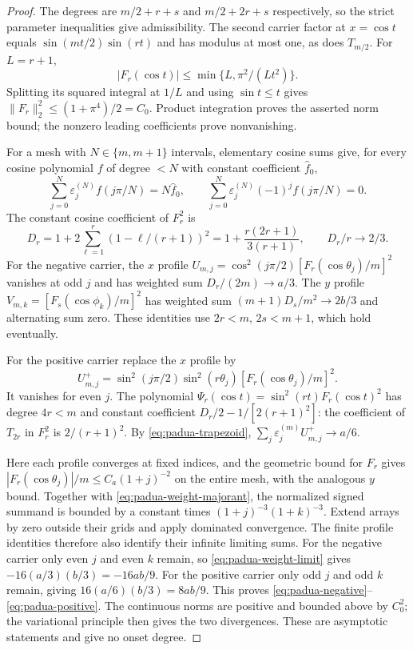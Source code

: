 \documentclass[preprint,12pt,a4paper]{elsarticle}
\theoremstyle{remark}
\begin{document}
\begin{proof}
The degrees are $m/2+r+s$ and $m/2+2r+s$ respectively, so the
strict parameter inequalities give admissibility. The second carrier
factor at $x=\cos t$ equals $\sin(mt/2)\sin(rt)$ and has modulus
at most one, as does $T_{m/2}$. For $L=r+1$,
\[
 |F_r(\cos t)|\le\min\{L,\pi^2/(Lt^2)\}.
\]
Splitting its squared integral at $1/L$ and using $\sin t\le t$
gives $\|F_r\|_2^2\le(1+\pi^4)/2=C_0$. Product integration proves
the asserted norm bound; the nonzero leading coefficients prove
nonvanishing.

For a mesh with $N\in\{m,m+1\}$ intervals, elementary
cosine sums give, for every cosine polynomial $f$ of degree $<N$ with constant
coefficient $\widehat f_0$,
\begin{equation}\label{eq:padua-trapezoid}
 \sum_{j=0}^N\varepsilon^{(N)}_jf(j\pi/N)=N\widehat f_0,\qquad
 \sum_{j=0}^N\varepsilon^{(N)}_j(-1)^jf(j\pi/N)=0.
\end{equation}
The constant cosine coefficient of $F_r^2$ is
\[
 D_r=1+2\sum_{\ell=1}^r(1-\ell/(r+1))^2
     =1+\frac{r(2r+1)}{3(r+1)},\qquad D_r/r\to2/3.
\]
For the negative carrier, the $x$ profile
$U_{m,j}=\cos^2(j\pi/2)[F_r(\cos\theta_j)/m]^2$
vanishes at odd $j$ and has weighted sum $D_r/(2m)\to a/3$.
The $y$ profile $V_{m,k}=[F_s(\cos\phi_k)/m]^2$ has weighted sum
$(m+1)D_s/m^2\to2b/3$ and alternating sum zero. These identities use
$2r<m$, $2s<m+1$, which hold eventually.

For the positive carrier replace the $x$ profile by
\[
 U^+_{m,j}=\sin^2(j\pi/2)\sin^2(r\theta_j)
                      [F_r(\cos\theta_j)/m]^2.
\]
It vanishes for even $j$. The polynomial
$\Psi_r(\cos t)=\sin^2(rt)F_r(\cos t)^2$ has degree $4r<m$ and constant
coefficient $D_r/2-1/[2(r+1)^2]$: the coefficient of $T_{2r}$ in
$F_r^2$ is $2/(r+1)^2$. By \eqref{eq:padua-trapezoid},
$\sum_j\varepsilon^{(m)}_jU^+_{m,j}\to a/6$.

Here each profile converges at fixed indices, and the geometric bound
for $F_r$ gives $|F_r(\cos\theta_j)|/m\le C_a(1+j)^{-2}$
on the entire mesh, with the analogous $y$ bound. Together with
\eqref{eq:padua-weight-majorant}, the normalized signed summand is
bounded by a constant times $(1+j)^{-3}(1+k)^{-3}$. Extend arrays by
zero outside their grids and apply dominated convergence. The finite
profile identities therefore also identify their infinite limiting
sums. For the negative carrier only even $j$ and even $k$ remain,
so \eqref{eq:padua-weight-limit} gives
$-16(a/3)(b/3)=-16ab/9$. For the positive carrier only odd $j$ and
odd $k$ remain, giving $16(a/6)(b/3)=8ab/9$.
This proves \eqref{eq:padua-negative}--\eqref{eq:padua-positive}.
The continuous norms are positive and bounded above by $C_0^2$;
the variational principle then gives the two divergences. These are
asymptotic statements and give no onset degree.
\end{proof}
\end{document}

